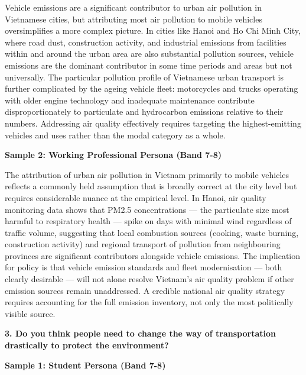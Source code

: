 Vehicle emissions are a significant contributor to urban air pollution in Vietnamese cities, but attributing most air pollution to mobile vehicles oversimplifies a more complex picture. In cities like Hanoi and Ho Chi Minh City, where road dust, construction activity, and industrial emissions from facilities within and around the urban area are also substantial pollution sources, vehicle emissions are the dominant contributor in some time periods and areas but not universally. The particular pollution profile of Vietnamese urban transport is further complicated by the ageing vehicle fleet: motorcycles and trucks operating with older engine technology and inadequate maintenance contribute disproportionately to particulate and hydrocarbon emissions relative to their numbers. Addressing air quality effectively requires targeting the highest-emitting vehicles and uses rather than the modal category as a whole.

\textbf{Sample 2: Working Professional Persona (Band 7-8)}

The attribution of urban air pollution in Vietnam primarily to mobile vehicles reflects a commonly held assumption that is broadly correct at the city level but requires considerable nuance at the empirical level. In Hanoi, air quality monitoring data shows that PM2.5 concentrations — the particulate size most harmful to respiratory health — spike on days with minimal wind regardless of traffic volume, suggesting that local combustion sources (cooking, waste burning, construction activity) and regional transport of pollution from neighbouring provinces are significant contributors alongside vehicle emissions. The implication for policy is that vehicle emission standards and fleet modernisation — both clearly desirable — will not alone resolve Vietnam's air quality problem if other emission sources remain unaddressed. A credible national air quality strategy requires accounting for the full emission inventory, not only the most politically visible source.

\separator

\begin{ieltsquestion}
\textbf{3. Do you think people need to change the way of transportation drastically to protect the environment?}
\end{ieltsquestion}
\textbf{Sample 1: Student Persona (Band 7-8)}


